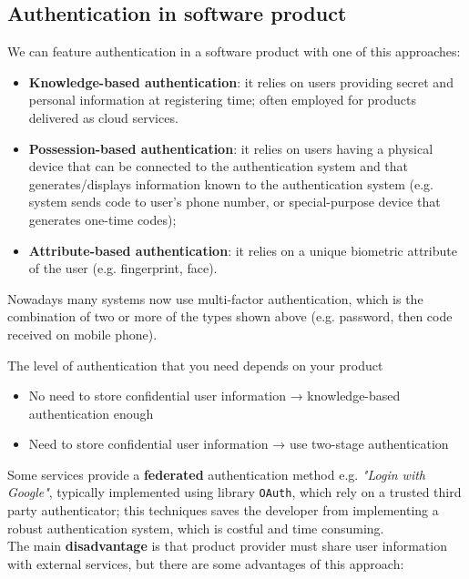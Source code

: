\subsection{Authentication in software product}
We can feature authentication in a software product with one of this approaches:
\begin{itemize}
   \item \textbf{Knowledge-based authentication}: it relies on users providing secret and personal information at registering time;  often employed for products delivered as
   cloud services.
   \item \textbf{Possession-based authentication}: it relies on users having a physical device that can be connected to the authentication system and that generates/displays information known to the authentication system (e.g. system sends code to user’s phone number, or special-purpose device that generates one-time codes);
   \item \textbf{Attribute-based authentication}: it relies on a unique biometric attribute of the user (e.g. fingerprint, face).
\end{itemize}
Nowadays many systems now use multi-factor authentication, which is the combination of two or more of the types shown above (e.g. password, then code received on mobile phone).

The level of authentication that you need depends on your product
\begin{itemize}
   \item No need to store confidential user information → knowledge-based authentication enough
   \item Need to store confidential user information → use two-stage authentication
\end{itemize}

Some services provide a \textbf{federated} authentication method e.g. \textit{"Login with Google"}, typically implemented using library \texttt{OAuth},
which rely on a trusted third party authenticator;
this techniques saves the developer from implementing a robust authentication system, which is costful and time consuming.\\
The main \textbf{disadvantage} is that product provider must share user information with external services, but there are some advantages of this approach:

